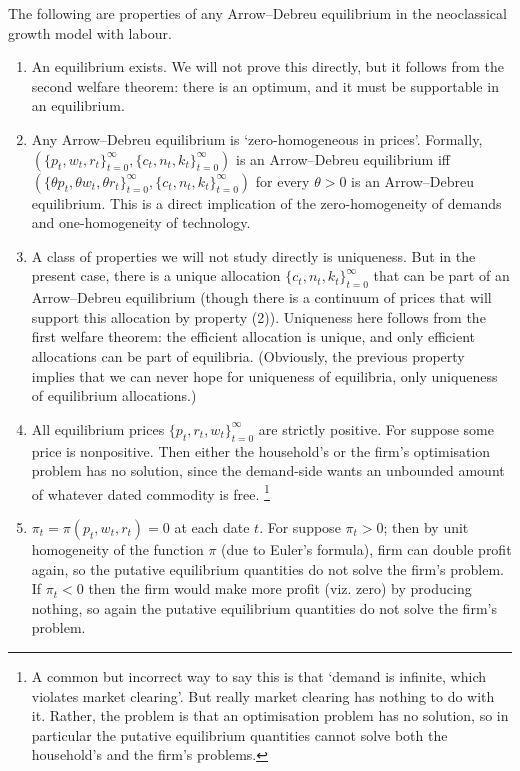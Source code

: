 \documentclass[11pt,letterpaper,reqno,oneside]{article}
\begin{document}
The following are properties of any Arrow--Debreu equilibrium in the neoclassical growth model with labour.
%
\begin{enumerate}

	\item An equilibrium exists. We will not prove this directly, but it follows from the second welfare theorem: there is an optimum, and it must be supportable in an equilibrium.

	\item Any Arrow--Debreu equilibrium is `zero-homogeneous in prices'. Formally, $\left( \{ p_t, w_t, r_t \}_{t=0}^\infty, \{ c_t, n_t, k_t \}_{t=0}^\infty \right)$ is an Arrow--Debreu equilibrium iff $\left( \{ \theta p_t, \theta w_t, \theta r_t \}_{t=0}^\infty, \{ c_t, n_t, k_t \}_{t=0}^\infty \right)$ for every $\theta>0$ is an Arrow--Debreu equilibrium. This is a direct implication of the zero-homogeneity of demands and one-homogeneity of technology.

	\item A class of properties we will not study directly is uniqueness. But in the present case, there is a unique allocation $\{ c_t, n_t, k_t \}_{t=0}^\infty$ that can be part of an Arrow--Debreu equilibrium (though there is a continuum of prices that will support this allocation by property (2)). Uniqueness here follows from the first welfare theorem: the efficient allocation is unique, and only efficient allocations can be part of equilibria. (Obviously, the previous property implies that we can never hope for uniqueness of equilibria, only uniqueness of equilibrium allocations.)

	\item All equilibrium prices $\{ p_t, r_t, w_t \}_{t=0}^\infty$ are strictly positive. For suppose some price is nonpositive. Then either the household's or the firm's optimisation problem has no solution, since the demand-side wants an unbounded amount of whatever dated commodity is free.%
		\footnote{A common but incorrect way to say this is that `demand is infinite, which violates market clearing'. But really market clearing has nothing to do with it. Rather, the problem is that an optimisation problem has no solution, so in particular the putative equilibrium quantities cannot solve both the household's and the firm's problems.}

	\item $\pi_t = \pi(p_t,w_t,r_t) = 0$ at each date $t$. For suppose $\pi_t > 0$; then by unit homogeneity of the function $\pi$ (due to Euler's formula), firm can double profit again, so the putative equilibrium quantities do not solve the firm's problem. If $\pi_t < 0$ then the firm would make more profit (viz. zero) by producing nothing, so again the putative equilibrium quantities do not solve the firm's problem.


\end{enumerate}
\end{document}
